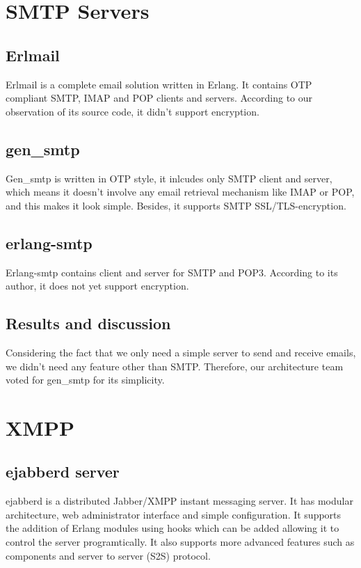 \documentclass[11pt,a4paper]{report}
\begin{document}
\section{SMTP Servers}
\subsection{Erlmail}
Erlmail is a complete email solution written in Erlang. It contains OTP
compliant SMTP, IMAP and POP clients and servers. According to our observation
of its source code, it didn't support encryption.

\subsection{gen\_smtp}
Gen\_smtp is written in OTP style, it inlcudes only SMTP client and server,
which means it doesn't involve any email retrieval mechanism like IMAP or POP,
and this makes it look simple. Besides, it supports SMTP SSL/TLS-encryption.

\subsection{erlang-smtp}
Erlang-smtp contains client and server for SMTP and POP3.
According to its author, it does not yet support encryption.

\subsection{Results and discussion}
Considering the fact that we only need a simple server to send and receive
emails, we didn't need any feature other than SMTP. Therefore,
our architecture team voted for gen\_smtp for its simplicity.

\section{XMPP}
\subsection{ejabberd server}
ejabberd is a distributed Jabber/XMPP instant messaging server. It has modular architecture, web administrator interface and simple configuration. It supports the addition of Erlang modules using hooks which can be added allowing it to control the server programtically. It also supports more advanced features such as components and server to server (S2S) protocol.
\end{document}
